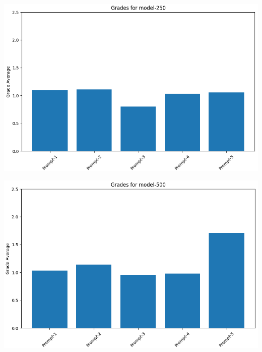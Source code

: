 \documentclass[12pt]{article}
\begin{document}
\begin{center}
    \begin{minipage}{0.49\textwidth}
        \centering
        \includegraphics[width=\textwidth]{img/plots/model-250-grades.png}
    \end{minipage} 
    \hfill
    \begin{minipage}{0.49\textwidth}
        \centering
        \includegraphics[width=\textwidth]{img/plots/model-500-grades.png}
    \end{minipage}

    \vspace{2em}
    

\end{center}
\end{document}
